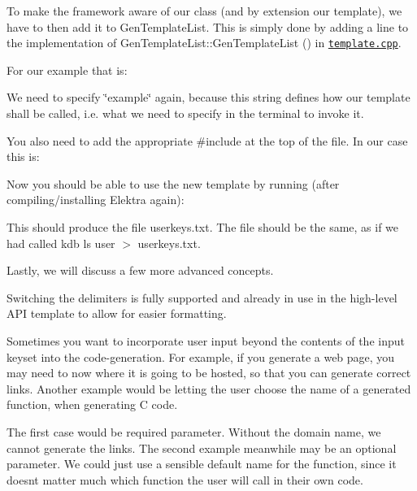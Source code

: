 To make the framework aware of our class (and by extension our template), we have to then add it to {\ttfamily Gen\+Template\+List}. This is simply done by adding a line to the implementation of {\ttfamily Gen\+Template\+List\+::\+Gen\+Template\+List ()} in \href{/home/mpranj/workspace/libelektra/src/tools/kdb/gen/template.cpp}{\texttt{ {\ttfamily template.\+cpp}}}.

For our example that is\+:


\begin{DoxyCode}{0}
\end{DoxyCode}


We need to specify {\ttfamily \char`\"{}example\char`\"{}} again, because this string defines how our template shall be called, i.\+e. what we need to specify in the terminal to invoke it.

You also need to add the appropriate {\ttfamily \#include} at the top of the file. In our case this is\+:


\begin{DoxyCode}{0}
\DoxyCodeLine{\textcolor{preprocessor}{\#include "example/example.hpp"}}
\end{DoxyCode}


Now you should be able to use the new template by running (after compiling/installing Elektra again)\+:


\begin{DoxyCode}{0}
\end{DoxyCode}


This should produce the file {\ttfamily userkeys.\+txt}. The file should be the same, as if we had called {\ttfamily kdb ls user $>$ userkeys.\+txt}.

Lastly, we will discuss a few more advanced concepts.

Switching the delimiters is fully supported and already in use in the high-\/level A\+PI template to allow for easier formatting.

Sometimes you want to incorporate user input beyond the contents of the input keyset into the code-\/generation. For example, if you generate a web page, you may need to now where it is going to be hosted, so that you can generate correct links. Another example would be letting the user choose the name of a generated function, when generating C code.

The first case would be required parameter. Without the domain name, we cannot generate the links. The second example meanwhile may be an optional parameter. We could just use a sensible default name for the function, since it doesn\textquotesingle{}t matter much which function the user will call in their own code.

